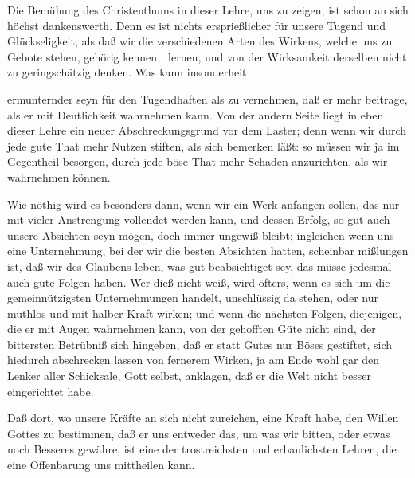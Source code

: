 Die Bemühung des Christenthums in dieser Lehre, uns zu zeigen,  ist schon an sich höchst dankenswerth. Denn es ist nichts ersprießlicher für unsere Tugend und Glückseligkeit, als daß wir die verschiedenen Arten des Wirkens, welche uns zu Gebote stehen, gehörig kennen~\ lernen, und von der Wirksamkeit derselben nicht zu geringschätzig denken. Was kann insonderheit
\begin{aufza}
\item ermunternder seyn für den Tugendhaften als zu vernehmen, daß er  mehr beitrage, als er mit Deutlichkeit wahrnehmen kann. Von der andern Seite liegt in eben dieser Lehre ein neuer Abschreckungsgrund vor dem Laster; denn wenn wir durch jede gute That mehr Nutzen stiften, als sich bemerken läßt: so müssen wir ja im Gegentheil besorgen, durch jede böse That mehr Schaden anzurichten, als wir wahrnehmen können.
\item Wie nöthig wird es besonders dann, wenn wir ein Werk anfangen sollen, das nur mit vieler Anstrengung vollendet werden kann, und dessen Erfolg, so gut auch unsere Absichten seyn mögen, doch immer ungewiß bleibt; ingleichen wenn uns eine Unternehmung, bei der wir die besten Absichten hatten, scheinbar mißlungen ist, daß wir des Glaubens leben,  was gut beabsichtiget sey, das müsse jedesmal auch gute Folgen haben. Wer dieß nicht weiß, wird öfters, wenn es sich um die gemeinnützigsten Unternehmungen handelt, unschlüssig da stehen, oder nur muthlos und mit halber Kraft wirken; und wenn die nächsten Folgen, diejenigen, die er mit Augen wahrnehmen kann, von der gehofften Güte nicht sind, der bittersten Betrübniß sich hingeben, daß er statt Gutes nur Böses gestiftet, sich hiedurch abschrecken lassen von fernerem Wirken, ja am Ende wohl gar den Lenker aller Schicksale, Gott selbst, anklagen, daß er die Welt nicht besser eingerichtet habe.
\item Daß dort, wo unsere Kräfte an sich nicht zureichen,  eine Kraft habe, den Willen Gottes zu bestimmen, daß er uns entweder das, um was wir bitten, oder etwas noch Besseres gewähre, ist eine der trostreichsten und erbaulichsten Lehren, die eine Offenbarung uns mittheilen kann.
\begin{aufzb}

\end{aufzb}
\end{aufza}
